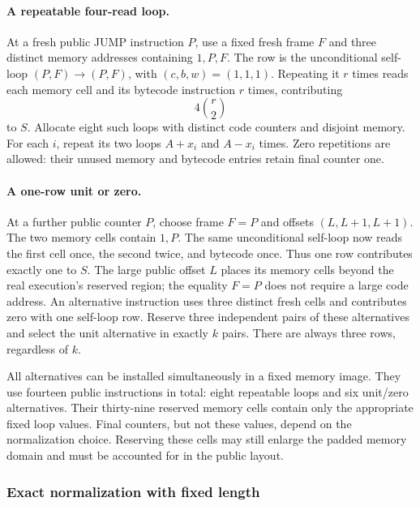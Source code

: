 \paragraph{A repeatable four-read loop.} At a fresh public JUMP instruction $P$, use a fixed fresh frame $F$ and three distinct memory addresses containing $1,P,F$. The row is the unconditional self-loop $(P,F)\to(P,F)$, with $(c,b,w)=(1,1,1)$. Repeating it $r$ times reads each memory cell and its bytecode instruction $r$ times, contributing
\[
 4\binom r2
\]
to $S$. Allocate eight such loops with distinct code counters and disjoint memory. For each $i$, repeat its two loops $A+x_i$ and $A-x_i$ times. Zero repetitions are allowed: their unused memory and bytecode entries retain final counter one.

\paragraph{A one-row unit or zero.} At a further public counter $P$, choose frame $F=P$ and offsets $(L,L+1,L+1)$. The two memory cells contain $1,P$. The same unconditional self-loop now reads the first cell once, the second twice, and bytecode once. Thus one row contributes exactly one to $S$. The large public offset $L$ places its memory cells beyond the real execution's reserved region; the equality $F=P$ does not require a large code address. An alternative instruction uses three distinct fresh cells and contributes zero with one self-loop row. Reserve three independent pairs of these alternatives and select the unit alternative in exactly $k$ pairs. There are always three rows, regardless of $k$.

All alternatives can be installed simultaneously in a fixed memory image. They use fourteen public instructions in total: eight repeatable loops and six unit/zero alternatives. Their thirty-nine reserved memory cells contain only the appropriate fixed loop values. Final counters, but not these values, depend on the normalization choice. Reserving these cells may still enlarge the padded memory domain and must be accounted for in the public layout.

\subsubsection{Exact normalization with fixed length}

